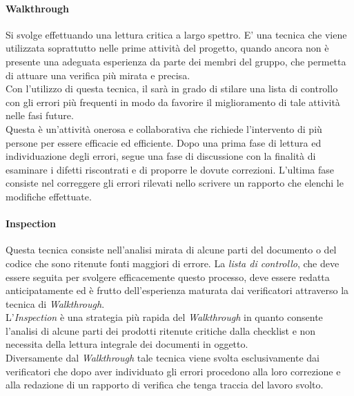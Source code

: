 \paragraph{Walkthrough}
Si svolge effettuando una lettura critica a largo spettro. E' una tecnica che viene utilizzata soprattutto nelle prime attività del progetto, quando ancora non è presente una adeguata esperienza da parte dei membri del gruppo, che permetta di attuare una verifica più mirata e precisa.\\
Con l'utilizzo di questa tecnica, il \textit{\Ver} sarà in grado di stilare una lista di controllo con gli errori più frequenti in modo da favorire il miglioramento di tale attività nelle fasi future.\\
Questa è un'attività onerosa e collaborativa che richiede l'intervento di più persone per essere efficacie ed efficiente. Dopo una prima fase di lettura ed individuazione degli errori, segue una fase di discussione con la finalità di esaminare i difetti riscontrati e di proporre le dovute correzioni. L'ultima fase consiste nel correggere gli errori rilevati nello scrivere un rapporto che elenchi le modifiche effettuate.

\paragraph{Inspection}
Questa tecnica consiste nell'analisi mirata di alcune parti del documento o del codice che sono ritenute fonti maggiori di errore. La \textit{lista di controllo}, che deve essere seguita per svolgere efficacemente questo processo, deve essere redatta anticipatamente ed è frutto dell'esperienza maturata dai verificatori attraverso la tecnica di \textit{Walkthrough}.\\
L'\textit{Inspection} è una strategia più rapida del \textit{Walkthrough} in quanto consente l'analisi di alcune parti dei prodotti ritenute critiche dalla checklist e non necessita della lettura integrale dei documenti in oggetto.\\
Diversamente dal \textit{Walkthrough} tale tecnica viene svolta esclusivamente dai verificatori che dopo aver individuato gli errori procedono alla loro correzione e alla redazione di un rapporto di verifica che tenga traccia del lavoro svolto.

